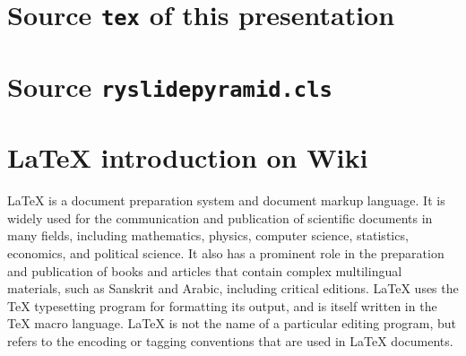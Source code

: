 \documentclass{ryslidepyramid}
\begin{document}
\newpage\section{Source {\tt tex} of this presentation}
\newpage\section{Source {\tt ryslidepyramid.cls}}
\newpage\section{\LaTeX{} introduction on Wiki}
\LaTeX{} is a document preparation system and document markup language.
It is widely used for the communication and publication of scientific documents in many fields,
including mathematics, physics, computer science, statistics, economics, and political science.
It also has a prominent role in the preparation and publication of books %
and articles that contain complex multilingual materials,
such as Sanskrit and Arabic, including critical editions.
\LaTeX{} uses the \TeX{} typesetting program for formatting its output,
and is itself written in the \TeX{} macro language.
\LaTeX{} is not the name of a particular editing program,
but refers to the encoding or tagging conventions that are used in \LaTeX{} documents.
\mybackcover
\end{document}
